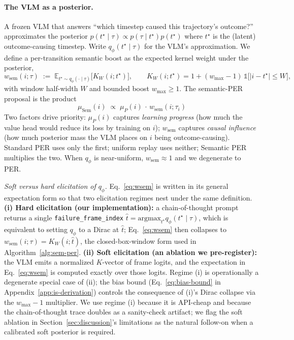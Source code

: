\documentclass{article}
\begin{document}
\paragraph{The VLM as a posterior.}
A frozen VLM that answers ``which timestep caused this trajectory's outcome?''
approximates the posterior $p(t^\star\mid\tau) \propto p(\tau\mid t^\star)p(t^\star)$
where $t^\star$ is the (latent) outcome-causing timestep. Write
$q_\phi(t^\star\mid\tau)$ for the VLM's approximation. We define a per-transition
semantic boost as the expected kernel weight under the posterior,
\begin{equation}
  w_{\text{sem}}(i;\tau) \;:=\; \mathbb{E}_{t^\star\sim q_\phi(\cdot\mid\tau)}\bigl[K_W(i;t^\star)\bigr],
  \qquad K_W(i;t^\star) = 1 + (w_{\max}\!-\!1)\,\mathbb{1}\bigl[|i-t^\star|\le W\bigr],
  \label{eq:wsem}
\end{equation}
with window half-width $W$ and bounded boost $w_{\max}\ge 1$. The semantic-PER
proposal is the product
\begin{equation}
  \boxed{\;\mu_{\text{Sem}}(i) \;\propto\; \mu_P(i)\,\cdot\,w_{\text{sem}}(i;\tau_i)\;}
  \label{eq:headline}
\end{equation}
Two factors drive priority: $\mu_P(i)$ captures \emph{learning progress} (how much
the value head would reduce its loss by training on $i$); $w_{\text{sem}}$
captures \emph{causal influence} (how much posterior mass the VLM places on $i$
being outcome-causing). Standard PER uses only the first; uniform replay uses
neither; Semantic PER multiplies the two. When $q_\phi$ is near-uniform,
$w_{\text{sem}}\!\approx\!1$ and we degenerate to PER.

\emph{Soft versus hard elicitation of $q_\phi$.} Eq.~\eqref{eq:wsem} is written
in its general expectation form so that two elicitation regimes nest under the
same definition. \textbf{(i) Hard elicitation (our implementation):} a
chain-of-thought prompt returns a single \texttt{failure\_frame\_index}
$\hat t = \mathrm{argmax}_{t^\star} q_\phi(t^\star\!\mid\!\tau)$, which is
equivalent to setting $q_\phi$ to a Dirac at $\hat t$; Eq.~\eqref{eq:wsem} then
collapses to $w_{\text{sem}}(i;\tau)=K_W(i;\hat t)$, the closed-box-window form
used in Algorithm~\ref{alg:sem-per}. \textbf{(ii) Soft elicitation (an
ablation we pre-register):} the VLM emits a normalized $K$-vector of frame
logits, and the expectation in Eq.~\eqref{eq:wsem} is computed exactly over
those logits. Regime (i) is operationally a degenerate special case of (ii);
the bias bound (Eq.~\eqref{eq:bias-bound} in Appendix~\ref{app:is-derivation})
controls the consequence of (i)'s Dirac collapse via the $w_{\max}\!-\!1$
multiplier. We use regime (i) because it is API-cheap and because the
chain-of-thought trace doubles as a sanity-check artifact; we flag the soft
ablation in Section~\ref{sec:discussion}'s limitations as the natural follow-on
when a calibrated soft posterior is required.
\end{document}
